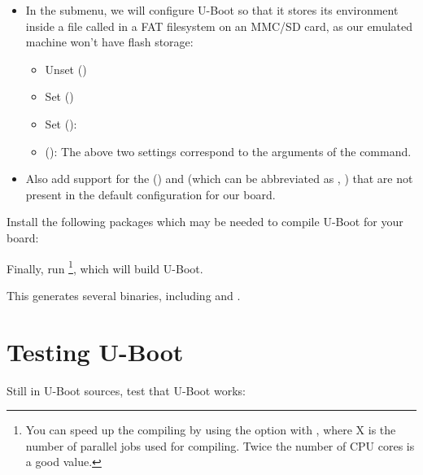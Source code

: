 \begin{itemize}
\item In the  submenu, we will configure U-Boot so
    that it stores its environment inside a file called 
    in a FAT filesystem on an MMC/SD card, as our emulated
    machine won't have flash storage:
    \begin{itemize}
    \item Unset  ()
    \item Set  ()
    \item Set  (): 
    \item {} (): \newline
        The above two settings correspond to the arguments of the
         command.
    \end{itemize}
\item Also add support for the  ()
    and  (which can be abbreviated as , )
    that are not present in the default configuration for our board.
\end{itemize}

Install the following packages which may be needed to compile U-Boot for
your board:


Finally, run \footnote{You can speed up the
compiling by using the  option with , where X
is the number of parallel jobs used for compiling. Twice the
number of CPU cores is a good value.}, which will build U-Boot.

This generates several binaries, including  and
.

\section{Testing U-Boot}

Still in U-Boot sources, test that U-Boot works:


